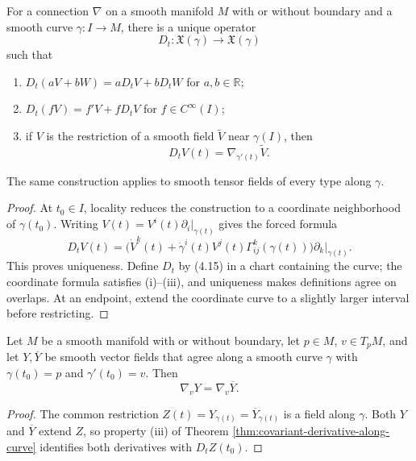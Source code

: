 \begin{theorem}
\label{thm:covariant-derivative-along-curve}




For a connection $\nabla$ on a smooth manifold $M$ with or without boundary and
a smooth curve $\gamma\colon I\to M$, there is a unique operator
\[
D_t\colon\mathfrak{X}(\gamma)\to\mathfrak{X}(\gamma)
\]
such that
\begin{enumerate}
\item[(i)] $D_t(aV+bW)=aD_tV+bD_tW$ for $a,b\in\mathbb R$;
\item[(ii)] $D_t(fV)=f'V+fD_tV$ for $f\in C^\infty(I)$;
\item[(iii)] if $V$ is the restriction of a smooth field $\widetilde V$ near
$\gamma(I)$, then
\[
D_tV(t)=\nabla_{\gamma'(t)}\widetilde V.
\]
\end{enumerate}
The same construction applies to smooth tensor fields of every type along
$\gamma$.
\end{theorem}
\begin{proof}
\sketch At $t_0\in I$, locality reduces the construction to a coordinate
neighborhood of $\gamma(t_0)$. Writing
$V(t)=V^i(t)\partial_i|_{\gamma(t)}$ gives the forced formula
\begin{equation}
D_tV(t)=\bigl(\dot V^k(t)+\dot\gamma^i(t)V^j(t)\Gamma^k_{ij}(\gamma(t))\bigr)
\partial_k|_{\gamma(t)}.\tag{4.15}
\end{equation}
This proves uniqueness. Define $D_t$ by (4.15) in a chart containing the curve;
the coordinate formula satisfies (i)--(iii), and uniqueness makes definitions
agree on overlaps. At an endpoint, extend the coordinate curve to a slightly
larger interval before restricting.
\end{proof}

\begin{proposition}
\label{prop:covariant-derivative-depends-on-curve}

Let $M$ be a smooth manifold with or without boundary, let $p\in M$,
$v\in T_pM$, and let $Y,\overline Y$ be smooth vector fields
that agree along a smooth curve $\gamma$ with $\gamma(t_0)=p$ and
$\gamma'(t_0)=v$. Then
\[
\nabla_vY=\nabla_v\overline Y.
\]
\end{proposition}
\begin{proof}
\sketch The common restriction $Z(t)=Y_{\gamma(t)}=\overline Y_{\gamma(t)}$
is a field along $\gamma$. Both $Y$ and $\overline Y$ extend $Z$, so property
(iii) of Theorem \ref{thm:covariant-derivative-along-curve} identifies both
derivatives with $D_tZ(t_0)$.
\end{proof}
